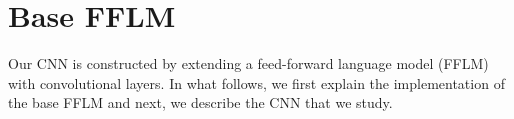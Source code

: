 





\section{Base FFLM}

Our CNN is constructed by extending a feed-forward language model (FFLM) with convolutional layers. In what follows, we first explain the implementation of the base FFLM and next, we describe the CNN that we study.


